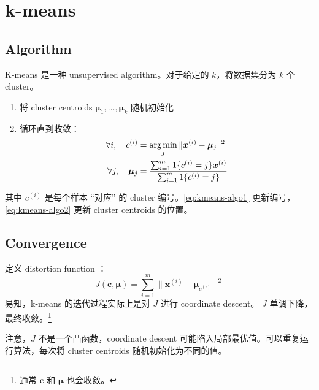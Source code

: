 \chapter{k-means}
	\section{Algorithm}
		K-means 是一种 unsupervised algorithm。对于给定的 $ k $，将数据集分为 $ k $ 个 cluster。
		\begin{enumerate}
			\item 将 cluster centroids $ \bm{\mu}_1, \ldots, \bm{\mu}_k $ 随机初始化
			\item 循环直到收敛：
			\begin{align}
				\forall i, \quad c^{(i)} &= \operatorname*{arg\,min}_j \| \bm{x}^{(i)} - \bm{\mu}_j \|^2 \label{eq:kmeans-algo1} \\
				\forall j, \quad \bm{\mu}_j &= \frac{\sum_{i=1}^m 1\{c^{(i)}=j\} \bm{x}^{(i)}}{\sum_{i=1}^m 1\{c^{(i)}=j\}} \label{eq:kmeans-algo2}
			\end{align}
		\end{enumerate}
		其中 $ c^{(i)} $ 是每个样本 “对应” 的 cluster 编号。\eqref{eq:kmeans-algo1} 更新编号，\eqref{eq:kmeans-algo2} 更新 cluster centroids 的位置。
	
	\section{Convergence}
		定义 distortion function ：
		\begin{equation}
			J(\bm{c}, \bm{\mu}) = \sum_{i=1}^{m} \| \bm{x}^{(i)} - \bm{\mu}_{c^{(i)}} \|^2
		\end{equation}
		易知，k-means 的迭代过程实际上是对 $ J $ 进行 coordinate descent。 $ J $ 单调下降，最终收敛。\footnote{通常 $ \bm{c} $ 和 $ \bm{\mu} $ 也会收敛。}
		
		注意，$ J $ 不是一个凸函数，coordinate descent 可能陷入局部最优值。可以重复运行算法，每次将 cluster centroids 随机初始化为不同的值。